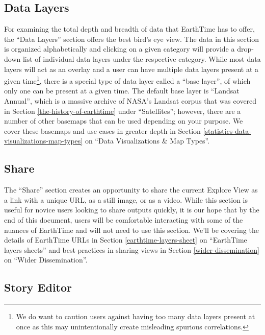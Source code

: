 \documentclass[
]{book}
\begin{document}
\hypertarget{data-layers}{%
\subsection*{Data Layers}\label{data-layers}}


For examining the total depth and breadth of data that EarthTime has to offer, the ``Data Layers'' section offers the best bird's eye view. The data in this section is organized alphabetically and clicking on a given category will provide a drop-down list of individual data layers under the respective category. While most data layers will act as an overlay and a user can have multiple data layers present at a given time\footnote{We do want to caution users against having too many data layers present at once as this may unintentionally create misleading spurious correlations.}, there is a special type of data layer called a ``base layer'', of which only one can be present at a given time. The default base layer is ``Landsat Annual'', which is a massive archive of NASA's Landsat corpus that was covered in Section \ref{the-history-of-earthtime} under ``Satellites''; however, there are a number of other basemaps that can be used depending on your purpose. We cover these basemaps and use cases in greater depth in Section \ref{statistics-data-visualizations-map-types} on ``Data Visualizations \& Map Types''.

\hypertarget{share}{%
\subsection*{Share}\label{share}}


The ``Share'' section creates an opportunity to share the current Explore View as a link with a unique URL, as a still image, or as a video. While this section is useful for novice users looking to share outputs quickly, it is our hope that by the end of this document, users will be comfortable interacting with some of the nuances of EarthTime and will not need to use this section. We'll be covering the details of EarthTime URLs in Section \ref{earthtime-layers-sheet} on ``EarthTime layers sheets'' and best practices in sharing views in Section \ref{wider-dissemination} on ``Wider Dissemination''.

\hypertarget{story-editor}{%
\subsection*{Story Editor}\label{story-editor}}
\end{document}
